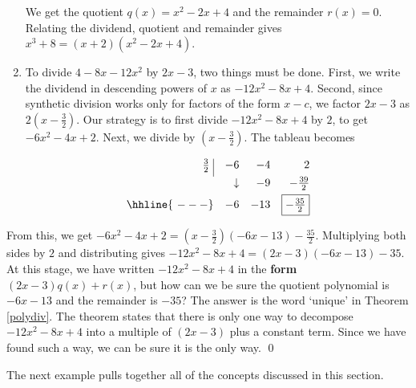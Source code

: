 \begin{ex}
\begin{enumerate}
We get the quotient $q(x) = x^2-2x+4$ and the remainder $r(x) =0$. Relating the dividend, quotient and remainder gives $x^3+8 = (x+2)\left( x^2-2x+4 \right)$.  

\item To divide $4-8x-12x^2$ by $2x-3$, two things must be done.  First, we write the dividend in descending powers of $x$ as $-12x^2-8x+4$.  Second, since synthetic division works only for factors of the form $x-c$, we factor $2x-3$ as $2\left(x-\frac{3}{2}\right)$.  Our strategy is to first divide $-12x^2-8x+4$ by $2$, to get $-6x^2-4x+2$.  Next, we divide by $\left(x-\frac{3}{2}\right)$.  The tableau becomes

\[ \begin{array}{rrrr}


  \frac{3}{2} \, \, \vline& -6 & -4 & 2   \\ [4pt]

   & \downarrow &  -9  & -\frac{39}{2}  \\ [4pt] \hhline{~---} 
  &  -6  &   -13  & \fbox{$-\frac{35}{2}$}  \\  
\end{array}\]


\end{enumerate}

From this, we get $-6x^2-4x+2 = \left(x-\frac{3}{2}\right)(-6 x - 13) - \frac{35}{2}$.  Multiplying both sides by $2$ and distributing gives $-12x^2-8x+4 = \left(2x-3\right) (-6 x - 13) - 35$.  At this stage, we have written $-12x^2-8x+4$ in the \textbf{form} $(2x-3) q(x) + r(x)$, but how can we be sure the quotient polynomial is $-6x-13$ and the remainder is $-35$?  The answer is the word `unique' in Theorem \ref{polydiv}.  The theorem states that there is only one way to decompose $-12x^2-8x+4$ into a multiple of $(2x-3)$  plus a constant term.  Since we have found such a way, we can be sure it is the only way. \qed


\end{ex}

The next example pulls together all of the concepts discussed in this section.  

